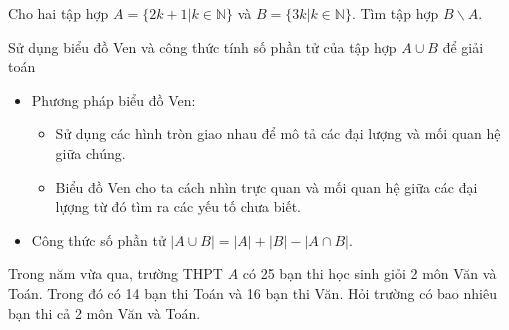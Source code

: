 \begin{bt}%
	Cho hai tập hợp $A=\{ 2k+1 | k \in \mathbb{N} \}$ và $B= \{3k| k \in \mathbb{N} \}$. Tìm tập hợp $B \backslash A$.
\end{bt}
\begin{dang}{Sử dụng biểu đồ Ven và công thức tính số phần tử của tập hợp $A \cup B$ để giải toán}
\begin{itemize}
\item Phương pháp biểu đồ Ven:
\begin{itemize}
\item Sử dụng các hình tròn giao nhau để mô tả các đại lượng và mối quan hệ giữa chúng.
\item Biểu đồ Ven cho ta cách nhìn trực quan và mối quan hệ giữa các đại lựợng từ đó tìm ra các yếu tố chưa biết.
\end{itemize}
\item Công thức số phần tử $|A \cup B| =|A| + |B| - |A \cap B|$.
\end{itemize}
\end{dang}
\begin{vd}%
	Trong năm vừa qua, trường THPT $A$ có 25 bạn thi học sinh giỏi 2 môn Văn và Toán. Trong đó có 14 bạn thi Toán và 16 bạn thi Văn. Hỏi trường có bao nhiêu bạn thi cả 2 môn Văn và Toán.
\end{vd}
